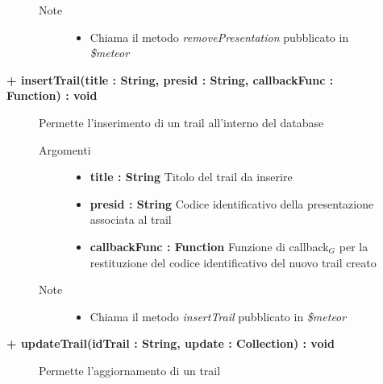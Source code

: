 \begin{description}
\begin{description}
\begin{description}
\begin{itemize}
				\end{itemize}
			\item[Note] \hfill
			\begin{itemize}
					\item Chiama il metodo \textit{removePresentation} pubblicato in \textit{\$meteor}
			\end{itemize}
		\end{description}
	\end{description}



	\begin{description}
		\item[\textbf{\color{blue}+ insertTrail(title : String, presid : String, callbackFunc : Function) : void			}] \hfill
			Permette l'inserimento di un trail all'interno del database
			
		\begin{description}
			\item[Argomenti] \hfill
				\begin{itemize}
					\item \textbf{title : String			} \hfill
					Titolo del trail da inserire
					\item \textbf{presid : String			} \hfill
					Codice identificativo della presentazione associata al trail
					\item \textbf{callbackFunc : Function			} \hfill
					Funzione di callback$_G$ per la restituzione del codice identificativo del nuovo trail creato
					
				\end{itemize}
			\item[Note] \hfill
			\begin{itemize}
					\item Chiama il metodo \textit{insertTrail} pubblicato in \textit{\$meteor}
			\end{itemize}
		\end{description}
	\end{description}
	
	\begin{description}
		\item[\textbf{\color{blue}+ updateTrail(idTrail : String, update : Collection) : void			}] \hfill
			Permette l'aggiornamento di un trail
			

\end{description}
\end{description}
